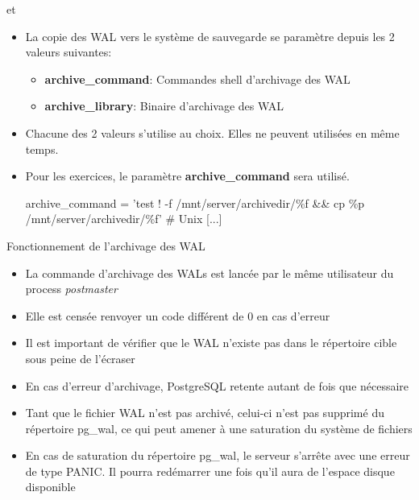 \begin{frame}[fragile]{ et }

\begin{itemize}

   \item La copie des WAL vers le système de sauvegarde se paramètre depuis les 2 valeurs suivantes:

   \begin{itemize}
      \item \textbf{archive\_command}: Commandes shell d'archivage des WAL
      \item \textbf{archive\_library}: Binaire d'archivage des WAL
   \end{itemize}

   \item Chacune des 2 valeurs s'utilise au choix. Elles ne peuvent utilisées en même temps.
   \item Pour les exercices, le paramètre \textbf{archive\_command} sera utilisé.

\begin{scriptsize}
   \begin{intercom}
archive\_command = 'test ! -f /mnt/server/archivedir/\%f && cp \%p /mnt/server/archivedir/\%f' # Unix
   [...]
   \end{intercom}
\end{scriptsize}

\end{itemize}

\end{frame}


\begin{frame}[fragile]{Fonctionnement de l'archivage des WAL}

\begin{itemize}

   \item La commande d'archivage des WALs est lancée par le même utilisateur du process \textit{postmaster}
   \item Elle est censée renvoyer un code différent de 0 en cas d'erreur
   \item Il est important de vérifier que le WAL n'existe pas dans le répertoire cible sous peine de l'écraser
   \item En cas d'erreur d'archivage, PostgreSQL retente autant de fois que nécessaire
   \item Tant que le fichier WAL n'est pas archivé, celui-ci n'est pas supprimé du répertoire pg\_wal, ce qui peut amener à une saturation du système de fichiers
   \item En cas de saturation du répertoire pg\_wal, le serveur s'arrête avec une erreur de type PANIC. Il pourra redémarrer une fois qu'il aura de l'espace disque disponible

\end{itemize}

\end{frame}

